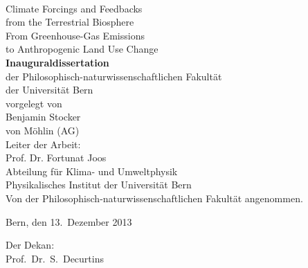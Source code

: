 \begin{titlepage}
\begin{center}
\mbox{}\\
{
\Huge\sf %
{Climate Forcings and Feedbacks\\\vspace{4pt}
from the Terrestrial Biosphere}\\\vspace{10pt}
\Large{From Greenhouse-Gas Emissions\\\vspace{4pt}
to Anthropogenic Land Use Change}\\
}
\vspace*{1cm}
{\sf
\textbf{Inauguraldissertation}\\\vspace{3pt}
der Philosophisch-naturwissenschaftlichen Fakultät\\\vspace{3pt}
der Universität Bern
}\\
\vspace{4.cm}
{\sf
vorgelegt von\\\vspace{6pt}
{\Large \sf %
Benjamin Stocker}\\\vspace{4pt}
von M\"{o}hlin (AG)
}\\
\vspace{3cm}
{\sf Leiter der Arbeit:\\\vspace{4pt}
Prof. Dr. Fortunat Joos}
\\\vspace{0.5cm}
{\sf Abteilung für Klima- und Umweltphysik\\\vspace{4pt}
Physikalisches Institut der Universität Bern}
\\\vspace{0.5cm}
{\sf Von der Philosophisch-naturwissenschaftlichen Fakult\"{a}t angenommen.}\\
\mdseries 
\end{center}
\vspace{1cm}
{\sf Bern, den 13.~Dezember 2013}
\hfill
\parbox[b]{4cm}{\sf
  Der Dekan: \\
  Prof.~Dr.~S.~Decurtins
}

\end{titlepage}
